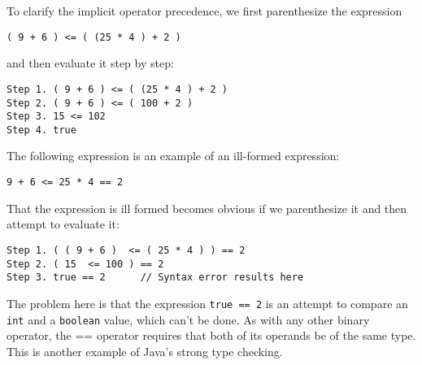 \noindent To clarify the implicit operator precedence, we
first parenthesize the 
\mbox{expression}

\begin{jjjlisting}
\begin{lstlisting}
( 9 + 6 ) <= ( (25 * 4 ) + 2 )
\end{lstlisting}
\end{jjjlisting}

\noindent and then evaluate it step by step:

\begin{jjjlisting}
\begin{lstlisting}
Step 1. ( 9 + 6 ) <= ( (25 * 4 ) + 2 )
Step 2. ( 9 + 6 ) <= ( 100 + 2 )
Step 3. 15 <= 102
Step 4. true
\end{lstlisting}
\end{jjjlisting}

\noindent The following expression is an example of an ill-formed expression:

\begin{jjjlisting}
\begin{lstlisting}
9 + 6 <= 25 * 4 == 2
\end{lstlisting}
\end{jjjlisting}

\noindent That the expression is ill formed
 becomes obvious if we parenthesize it and then attempt to evaluate
it:

\begin{jjjlisting}
\begin{lstlisting}
Step 1. ( ( 9 + 6 )  <= ( 25 * 4 ) ) == 2
Step 2. ( 15  <= 100 ) == 2
Step 3. true == 2      // Syntax error results here
\end{lstlisting}
\end{jjjlisting}

\noindent The problem here is that the expression
{\tt true == 2} is an attempt to compare an {\tt int} and a
{\tt boolean} value, which can't be done.  As with any other binary
operator, the == operator requires that both
of its operands be of the
same type.  This is another example of Java's strong type checking.



